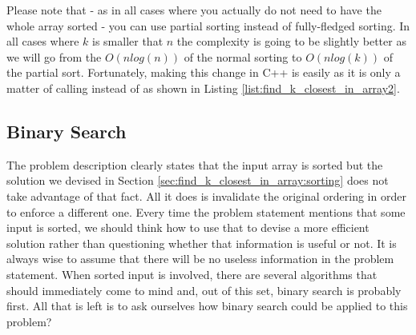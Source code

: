 Please note that -  as in all cases where you actually do not need to have the whole array sorted  - you
can use partial sorting instead of fully-fledged sorting. In all cases where $k$ is smaller that
$n$ the complexity is going to be slightly better as we will go from the $O(nlog(n))$ of the normal
sorting to $O(nlog(k))$ of the partial sort. Fortunately, making this change in C++ is
easily as it is only a matter of calling  instead of  as
shown in Listing \ref{list:find_k_closest_in_array2}.



\subsection{Binary Search}
\label{find_k_closest_in_array:sec:binary_search}
The problem description clearly states that the input array is sorted but the solution we
devised in Section \ref{sec:find_k_closest_in_array:sorting} does not take advantage of that fact.
 All it does is invalidate the original ordering in order to enforce a different one. Every time
the problem statement mentions that some input is sorted, we should think how to use that 
to devise a more efficient solution rather than questioning whether that information is useful or
not. It is always wise to assume that there will be no useless information in the problem statement. When sorted input is
involved, there are several algorithms that should immediately come to mind and, out  of this set, binary
search is probably first. All that is left is to ask ourselves how binary search could be applied to this
problem?

